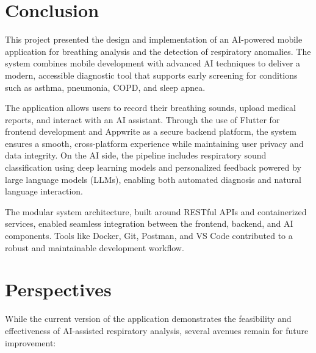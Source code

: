 
\section*{Conclusion}

This project presented the design and implementation of an AI-powered mobile application for breathing analysis and the detection of respiratory anomalies. The system combines mobile development with advanced AI techniques to deliver a modern, accessible diagnostic tool that supports early screening for conditions such as asthma, pneumonia, COPD, and sleep apnea.

The application allows users to record their breathing sounds, upload medical reports, and interact with an AI assistant. Through the use of Flutter for frontend development and Appwrite as a secure backend platform, the system ensures a smooth, cross-platform experience while maintaining user privacy and data integrity. On the AI side, the pipeline includes respiratory sound classification using deep learning models and personalized feedback powered by large language models (LLMs), enabling both automated diagnosis and natural language interaction.

The modular system architecture, built around RESTful APIs and containerized services, enabled seamless integration between the frontend, backend, and AI components. Tools like Docker, Git, Postman, and VS Code contributed to a robust and maintainable development workflow.

\section*{Perspectives}

While the current version of the application demonstrates the feasibility and effectiveness of AI-assisted respiratory analysis, several avenues remain for future improvement:

